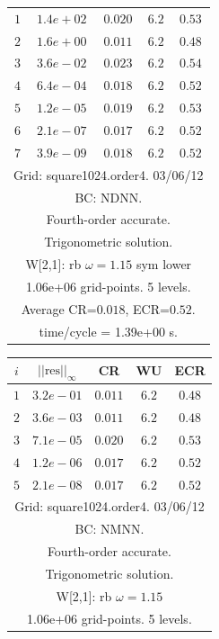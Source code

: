 \begin{table}[hbt]
\begin{center}
{\begin{tabular}{|c|c|c|c|c|}
 $ 1$  & $ 1.4e+02$ & $0.020$ & $ 6.2$ & $0.53$ \\ 
 $ 2$  & $ 1.6e+00$ & $0.011$ & $ 6.2$ & $0.48$ \\ 
 $ 3$  & $ 3.6e-02$ & $0.023$ & $ 6.2$ & $0.54$ \\ 
 $ 4$  & $ 6.4e-04$ & $0.018$ & $ 6.2$ & $0.52$ \\ 
 $ 5$  & $ 1.2e-05$ & $0.019$ & $ 6.2$ & $0.53$ \\ 
 $ 6$  & $ 2.1e-07$ & $0.017$ & $ 6.2$ & $0.52$ \\ 
 $ 7$  & $ 3.9e-09$ & $0.018$ & $ 6.2$ & $0.52$ \\ 
\hline 
\multicolumn{5}{|c|}{Grid: square1024.order4. 03/06/12}  \\
\multicolumn{5}{|c|}{BC: NDNN.}  \\
\multicolumn{5}{|c|}{Fourth-order accurate.}  \\
\multicolumn{5}{|c|}{Trigonometric solution.}  \\
\multicolumn{5}{|c|}{W[2,1]: rb $\omega=1.15$ sym lower}  \\
\multicolumn{5}{|c|}{1.06e+06 grid-points. 5 levels.}  \\
\multicolumn{5}{|c|}{Average CR=$0.018$, ECR=$0.52$.}  \\
\multicolumn{5}{|c|}{time/cycle = 1.39e+00 s.}  \\
\hline 
\end{tabular}
\begin{tabular}{|c|c|c|c|c|} \hline 
 $i$   & $\vert\vert\mbox{res}\vert\vert_\infty$  &  CR     &  WU    & ECR  \\   \hline 
 $ 1$  & $ 3.2e-01$ & $0.011$ & $ 6.2$ & $0.48$ \\ 
 $ 2$  & $ 3.6e-03$ & $0.011$ & $ 6.2$ & $0.48$ \\ 
 $ 3$  & $ 7.1e-05$ & $0.020$ & $ 6.2$ & $0.53$ \\ 
 $ 4$  & $ 1.2e-06$ & $0.017$ & $ 6.2$ & $0.52$ \\ 
 $ 5$  & $ 2.1e-08$ & $0.017$ & $ 6.2$ & $0.52$ \\ 
\hline 
\multicolumn{5}{|c|}{Grid: square1024.order4. 03/06/12}  \\
\multicolumn{5}{|c|}{BC: NMNN.}  \\
\multicolumn{5}{|c|}{Fourth-order accurate.}  \\
\multicolumn{5}{|c|}{Trigonometric solution.}  \\
\multicolumn{5}{|c|}{W[2,1]: rb $\omega=1.15$}  \\
\multicolumn{5}{|c|}{1.06e+06 grid-points. 5 levels.}  \\

\end{tabular}}
\end{center}
\end{table}
